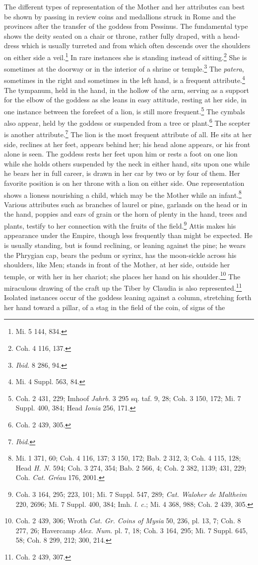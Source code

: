 \documentclass[a4paper, 11pt, oneside, polutonikogreek, english]{article}
\begin{document}
The different types of representation of the Mother and her attributes can best be shown by passing in review coins and medallions struck in Rome and the provinces after the transfer of the goddess from Pessinus. The fundamental type shows the deity seated on a chair or throne, rather fully draped, with a head-dress which is usually turreted and from which often descends over the shoulders on either side a veil.\footnote{Mi. 5 144, 834.} In rare instances she is standing instead of sitting.\footnote{Coh. 4 116, 137.} She is sometimes at the doorway or in the interior of a shrine or temple.\footnote{\emph{Ibid.} 8 286, 94.} The \emph{patera}, sometimes in the right and sometimes in the left hand, is a frequent attribute.\footnote{Mi. 4 Suppl. 563, 84.} The tympanum, held in the hand, in the hollow of the arm, serving as a support for the elbow of the goddess as she leans in easy attitude, resting at her side, in one instance between the forefeet of a lion, is still more frequent.\footnote{Coh. 2 431, 229; Imhoof \emph{Jahrb.} 3 295 sq. taf. 9, 28; Coh. 3 150, 172; Mi. 7 Suppl. 400, 384; Head \emph{Ionia} 256, 171.} The cymbals also appear, held by the goddess or suspended from a tree or plant.\footnote{Coh. 2 439, 305.} The scepter is another attribute.\footnote{\emph{Ibid.}} The lion is the most frequent attribute of all. He sits at her side, reclines at her feet, appears behind her; his head alone appears, or his front alone is seen. The goddess rests her feet upon him or rests a foot on one lion while she holds others suspended by the neck in either hand, sits upon one while he bears her in full career, is drawn in her car by two or by four of them. Her favorite position is on her throne with a lion on either side. One representation shows a lioness nourishing a child, which may be the Mother while an infant.\footnote{Mi. 1 371, 60; Coh. 4 116, 137; 3 150, 172; Bab. 2 312, 3; Coh. 4 115, 128; Head \emph{H. N.} 594; Coh. 3 274, 354; Bab. 2 566, 4; Coh. 2 382, 1139; 431, 229; Coh. \emph{Cat. Gréau} 176, 2001.} Various attributes such as branches of laurel or pine, garlands on the head or in the hand, poppies and ears of grain or the horn of plenty in the hand, trees and plants, testify to her connection with the fruits of the field.\footnote{Coh. 3 164, 295; 223, 101; Mi. 7 Suppl. 547, 289; \emph{Cat. Waloher de Maltheim} 220, 2696; Mi. 7 Suppl. 400, 384; Imh. \emph{l. c.}; Mi. 4 368, 988; Coh. 2 439, 305.} Attis makes his appearance under the Empire, though less frequently than might be expected. He is usually standing, but is found reclining, or leaning against the pine; he wears the Phrygian cap, bears the pedum or syrinx, has the moon-sickle across his shoulders, like Men; stands in front of the Mother, at her side, outside her temple, or with her in her chariot; she places her hand on his shoulder.\footnote{Coh. 2 439, 306; Wroth \emph{Cat. Gr. Coins of Mysia} 50, 236, pl. 13, 7; Coh. 8 277, 26; Havercamp \emph{Alex. Num.} pl. 7, 18; Coh. 3 164, 295; Mi. 7 Suppl. 645, 58; Coh. 8 299, 212; 300, 214.} The miraculous drawing of the craft up the Tiber by Claudia is also represented.\footnote{Coh. 2 439, 307.} Isolated instances occur of the goddess leaning against a column, stretching forth her hand toward a pillar, of a stag in the field of the coin, of signs of the 
\end{document}
